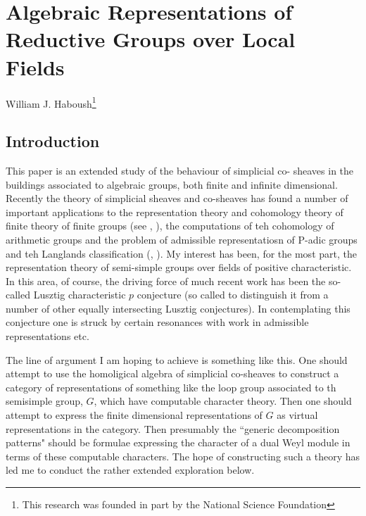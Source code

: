\chapter{Algebraic Representations of Reductive Groups over Local Fields}\label{chap6}


\begin{center}
William J. Haboush\footnote{This research was founded in part by the National Science Foundation}
\end{center}


\section*{Introduction}
\pageoriginale

This paper is an extended study of the behaviour of simplicial co- sheaves in the buildings associated to algebraic groups, both finite and infinite dimensional. Recently the theory of simplicial sheaves and co-sheaves has found a number of important applications to the representation theory and cohomology theory of finite theory of finite groups (see \cite{chap6-keyT}, \cite{chap6-keyRS}), the computations of teh cohomology of arithmetic groups and the problem of admissible representatiosn of P-adic groups and teh Langlands classification (\cite{chap6-keyCW}, \cite{chap6-keyBW}). My interest has been, for the most part, the representation theory of semi-simple groups over fields of positive characteristic. In this area, of course, the driving force of much recent work has been the so-called Lusztig characteristic $p$ conjecture \cite{chap6-keyL1} (so called to distinguish it from a number of other equally intersecting Lusztig conjectures). In contemplating this conjecture one is struck by certain resonances with work in admissible representations etc.

The line of argument I am hoping to achieve is something like this. One should attempt to use the homoligical algebra of simplicial co-sheaves to construct a category of representations of something like the loop group associated to th semisimple group, $G$, which have computable character theory. Then one should attempt to express the finite dimensional representations of $G$ as virtual representations in the category. Then presumably the ``generic decomposition patterns" should be formulae expressing the character of a dual Weyl module in terms of these computable characters. The hope of constructing such a theory has led me to conduct the rather extended exploration below.  

